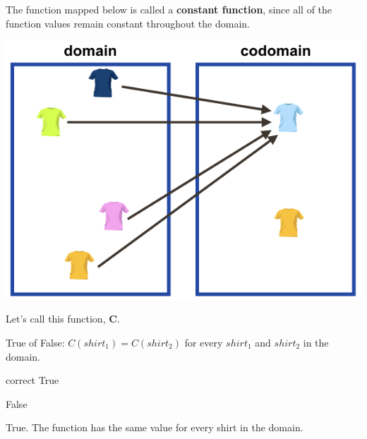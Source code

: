 \documentclass{ximera}
\begin{document}
The function mapped below is called a \textbf{constant function}, since all of the function values remain constant throughout the domain.
\begin{image}
\includegraphics{pics/const_func.png}
\end{image}

Let's call this function, \textbf{C}.


\begin{question}
True of False: $C(shirt_1) = C(shirt_2)$ for every $shirt_1$ and $shirt_2$ in the domain.
\begin{multipleChoice}
\item[correct] {True}
\item {False}
\end{multipleChoice}
\begin{feedback}
True.  The function has the same value for every shirt in the domain.
\end{feedback}
\end{question}
\end{document}
